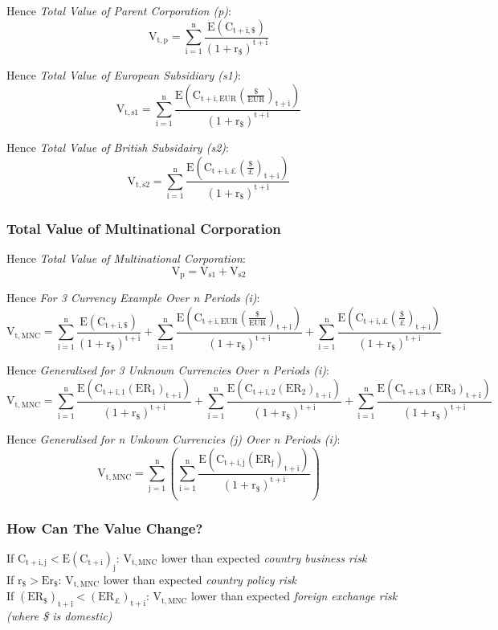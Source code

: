 \documentclass[11pt, english]{article}
\begin{document}
	Hence \textit{Total Value of Parent Corporation (p)}:
	$$\mathrm{V_{t,p}=\sum_{i=1}^n\frac{E(C_{t+i,\$})}{(1+r_\$)^{t+i}}}$$

	Hence \textit{Total Value of European Subsidiary (s1)}:
	$$\mathrm{V_{t,s1}=\sum_{i=1}^n\frac{E\left(C_{t+i,EUR}\left(\frac{\$}{EUR}\right)_{t+i}\right)}{(1+r_\$)^{t+i}}}$$

	Hence \textit{Total Value of British Subsidairy (s2)}:
	$$\mathrm{V_{t,s2}=\sum_{i=1}^n\frac{E\left(C_{t+i,\pounds}\left(\frac{\$}{\pounds}\right)_{t+i}\right)}{(1+r_\$)^{t+i}}}$$

		\subsubsection{Total Value of Multinational Corporation}

	Hence \textit{Total Value of Multinational Corporation}:
	$$\mathrm{V_p=V_{s1}+V_{s2}}$$

	Hence \textit{For 3 Currency Example Over n Periods (i)}:
	$$\mathrm{V_{t,MNC}=\sum_{i=1}^n\frac{E(C_{t+i,\$})}{(1+r_\$)^{t+i}}+\sum_{i=1}^n\frac{E\left(C_{t+i,EUR}\left(\frac{\$}{EUR}\right)_{t+i}\right)}{(1+r_\$)^{t+i}}+\sum_{i=1}^n\frac{E\left(C_{t+i,\pounds}\left(\frac{\$}{\pounds}\right)_{t+i}\right)}{(1+r_\$)^{t+i}}}$$

	Hence \textit{Generalised for 3 Unknown Currencies Over n Periods (i)}:
	$$\mathrm{V_{t,MNC}=\sum_{i=1}^n\frac{E\left(C_{t+i,1}(ER_1)_{t+i}\right)}{(1+r_\$)^{t+i}}+\sum_{i=1}^n\frac{E\left(C_{t+i,2}(ER_2)_{t+i}\right)}{(1+r_\$)^{t+i}}+\sum_{i=1}^n\frac{E\left(C_{t+i,3}(ER_3)_{t+i}\right)}{(1+r_\$)^{t+i}}}$$

	Hence \textit{Generalised for n Unkown Currencies (j) Over n Periods (i)}: 
	$$\mathrm{V_{t,MNC}=\sum_{j=1}^n\left(\sum_{i=1}^n\frac{E\left(C_{t+i,j}(ER_j)_{t+i}\right)}{(1+r_\$)^{t+i}}\right)}$$

		\subsubsection{How Can The Value Change?}

	If $\mathrm{C_{t+i,j}<E(C_{t+i})_j}$: $\mathrm{V_{t,MNC}}$ lower than expected \textit{country business risk}\\
If $\mathrm{r_\$>E{r_\$}}$: $\mathrm{V_{t,MNC}}$ lower than expected \textit{country policy risk}\\
If $\mathrm{(ER_\$)_{t+i}<(ER_{\pounds})_{t+i}}$: $\mathrm{V_{t,MNC}}$ lower than expected \textit{foreign exchange risk (where \$ is domestic)}
\end{document}
